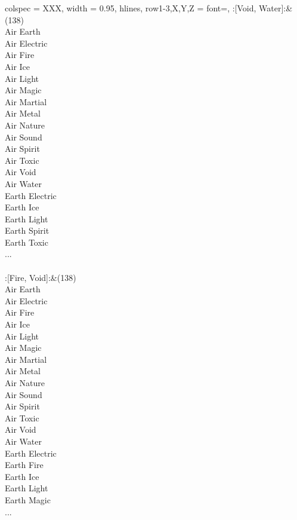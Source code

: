\twocolumn
\begin{longtblr}[
	caption = {2v2 Defending Weak},
	label = {2v2-Defending-Weak},
]{
	colspec = {XXX}, width = 0.95\linewidth,
	hlines,
	row{1-3,X,Y,Z} = {font=\bfseries},
}
	:[Void, Water]:&{(138)\\
	Air Earth \\
	Air Electric \\
	Air Fire \\
	Air Ice \\
	Air Light \\
	Air Magic \\
	Air Martial \\
	Air Metal \\
	Air Nature \\
	Air Sound \\
	Air Spirit \\
	Air Toxic \\
	Air Void \\
	Air Water \\
	Earth Electric \\
	Earth Ice \\
	Earth Light \\
	Earth Spirit \\
	Earth Toxic \\
	...\\
	}\\

	:[Fire, Void]:&{(138)\\
	Air Earth \\
	Air Electric \\
	Air Fire \\
	Air Ice \\
	Air Light \\
	Air Magic \\
	Air Martial \\
	Air Metal \\
	Air Nature \\
	Air Sound \\
	Air Spirit \\
	Air Toxic \\
	Air Void \\
	Air Water \\
	Earth Electric \\
	Earth Fire \\
	Earth Ice \\
	Earth Light \\
	Earth Magic \\
	...\\
	}\\


\end{longtblr}
